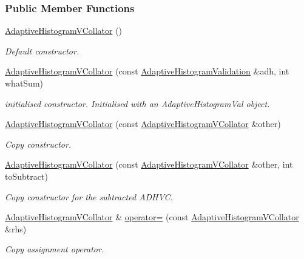\subsubsection*{\-Public \-Member \-Functions}
\begin{DoxyCompactItemize}
\item 
\hyperlink{classsubpavings_1_1AdaptiveHistogramVCollator_addfe1e7d9ec6cfeed3bcbd6f35ce98b2}{\-Adaptive\-Histogram\-V\-Collator} ()
\begin{DoxyCompactList}\small\item\em \-Default constructor. \end{DoxyCompactList}\item 
\hyperlink{classsubpavings_1_1AdaptiveHistogramVCollator_a28798e968c6693434cd189a64b185b96}{\-Adaptive\-Histogram\-V\-Collator} (const \hyperlink{classsubpavings_1_1AdaptiveHistogramValidation}{\-Adaptive\-Histogram\-Validation} \&adh, int what\-Sum)
\begin{DoxyCompactList}\small\item\em initialised constructor. \-Initialised with an \-Adaptive\-Histogram\-Val object. \end{DoxyCompactList}\item 
\hyperlink{classsubpavings_1_1AdaptiveHistogramVCollator_ab2c174cc93b8d61a5dae5d698a47e392}{\-Adaptive\-Histogram\-V\-Collator} (const \hyperlink{classsubpavings_1_1AdaptiveHistogramVCollator}{\-Adaptive\-Histogram\-V\-Collator} \&other)
\begin{DoxyCompactList}\small\item\em \-Copy constructor. \end{DoxyCompactList}\item 
\hyperlink{classsubpavings_1_1AdaptiveHistogramVCollator_af0f2129ebf8fc93357f877c5bac8e5b8}{\-Adaptive\-Histogram\-V\-Collator} (const \hyperlink{classsubpavings_1_1AdaptiveHistogramVCollator}{\-Adaptive\-Histogram\-V\-Collator} \&other, int to\-Subtract)
\begin{DoxyCompactList}\small\item\em \-Copy constructor for the subtracted \-A\-D\-H\-V\-C. \end{DoxyCompactList}\item 
\hyperlink{classsubpavings_1_1AdaptiveHistogramVCollator}{\-Adaptive\-Histogram\-V\-Collator} \& \hyperlink{classsubpavings_1_1AdaptiveHistogramVCollator_a06855795e0d1d9c5a268ec91153346d4}{operator=} (const \hyperlink{classsubpavings_1_1AdaptiveHistogramVCollator}{\-Adaptive\-Histogram\-V\-Collator} \&rhs)
\begin{DoxyCompactList}\small\item\em \-Copy assignment operator. \end{DoxyCompactList}\item 

\end{DoxyCompactItemize}
